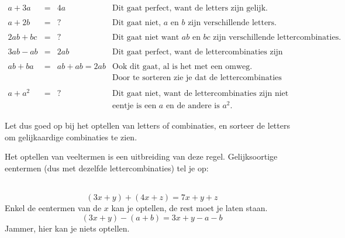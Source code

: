 \begin{voorbeeld}
	\ \\
		\begin{center}
		\begin{equation*}
		\begin{array}{cccr}
		a+3a&=&4a &  \text{Dit gaat perfect, want de letters zijn gelijk.} \\
		&&&\\
		a+2b&=&?& \text{Dit gaat niet, $a$ en $b$ zijn verschillende
		letters.} \\
			&&&\\
		2ab+bc&=&?& \text{Dit gaat niet want $ab$ en $bc$ zijn verschillende
		lettercombinaties. }\\
			&&&\\
		3ab-ab&=&2ab& \text{Dit gaat perfect, want de lettercombinaties
		zijn gelijk.} \\
			&&&\\
		ab+ba&=&ab+ab=2ab & \text{Ook dit gaat, al is het met een omweg.} \\
		& & & \text{Door te sorteren zie je dat de lettercombinaties gelijk zijn.}\\
				&&&\\
		a+a^{2}&=&?& \text{Dit gaat niet, want de lettercombinaties zijn niet gelijk,}\\
		& & & \text{eentje is een $a$ en de andere is $a^{2}$.}
		\end{array}
		\end{equation*}
	\end{center}
\end{voorbeeld}
	
	Let dus goed op bij het optellen van letters of combinaties, en sorteer
	de letters om gelijkaardige combinaties te zien. 
	
	Het optellen van veeltermen is een uitbreiding van deze
	regel. Gelijksoortige eentermen (dus met dezelfde lettercombinaties)
	tel je op: 
	
	\begin{voorbeeld}
		\ \\
		\begin{equation*}
		(3x+y)+(4x+z)=7x+y+z
		\end{equation*} Enkel de eentermen van de $x$ kan
		je optellen, de rest moet je laten staan.
		\begin{equation*}
		(3x+y)-(a+b)=3x+y-a-b
		\end{equation*} Jammer, hier kan je niets optellen.
	\end{voorbeeld}
	
